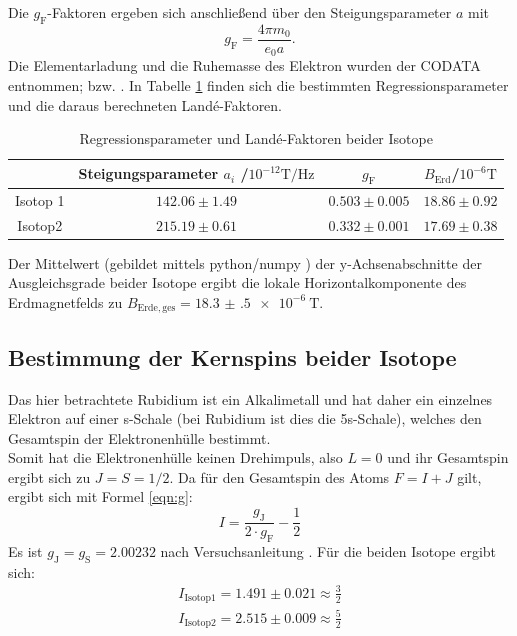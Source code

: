 Die $g_{\mathrm{F}}$-Faktoren ergeben sich anschließend über den Steigungsparameter $a$ mit
\begin{equation*}
  g_{\mathrm{F}}=\frac{4\pi m_0}{e_0 a}\mathrm{.}
\end{equation*}
Die Elementarladung und die Ruhemasse des Elektron wurden der CODATA entnommen; \cite{e} bzw. \cite{m_0}.
In Tabelle \ref{tab:res1} finden sich die bestimmten Regressionsparameter und die daraus berechneten Landé-Faktoren.
\begin{table}
  \caption{Regressionsparameter und Landé-Faktoren beider Isotope}
  \label{tab:res1}
 \centering
 \begin{tabular}{cccc}
   \toprule
&Steigungsparameter $a_i$ /$ 10^{-12}\si{\tesla\per\hertz}$&$g_{\mathrm{F}}$&$B_{\mathrm{Erd}}$/$10^{-6}\si{\tesla}$\\
\midrule
Isotop 1&$142.06\pm1.49$&$0.503\pm0.005$&$18.86\pm0.92$\\
Isotop2&$215.19\pm0.61$&$0.332\pm0.001$ &$17.69\pm0.38$\\
\bottomrule
\end{tabular}
\end{table}
Der Mittelwert (gebildet mittels python/numpy \cite{numpy}) der y-Achsenabschnitte der Ausgleichsgrade beider Isotope ergibt die lokale Horizontalkomponente des Erdmagnetfelds zu $B_{\mathrm{Erde,ges}}=\SI{18.3(5)e-6}{\tesla}$.




\subsection{Bestimmung der Kernspins beider Isotope}
Das hier betrachtete Rubidium ist ein Alkalimetall und hat daher ein einzelnes Elektron auf einer s-Schale (bei Rubidium ist dies die 5s-Schale), welches den Gesamtspin der Elektronenhülle bestimmt.\\
Somit hat die Elektronenhülle keinen Drehimpuls, also $L=0$ und ihr Gesamtspin ergibt sich zu $J=S=1/2$. Da für den Gesamtspin des Atoms $F=I+J$ gilt, ergibt sich mit Formel \eqref{eqn:g}:
\begin{equation*}
I=\frac{g_{\mathrm{J}}}{2\cdot g_{\mathrm{F}}}-\frac{1}{2}
\end{equation*}
Es ist $g_{\mathrm{J}}=g_{\mathrm{S}}=2.00232$ nach Versuchsanleitung \cite{Anleitung}.
Für die beiden Isotope ergibt sich:
\begin{gather*}
  I_{\mathrm{Isotop 1}}=1.491\pm0.021\approx\frac{3}{2}\\
  I_{\mathrm{Isotop 2}}=2.515\pm0.009\approx\frac{5}{2}\\
\end{gather*}


